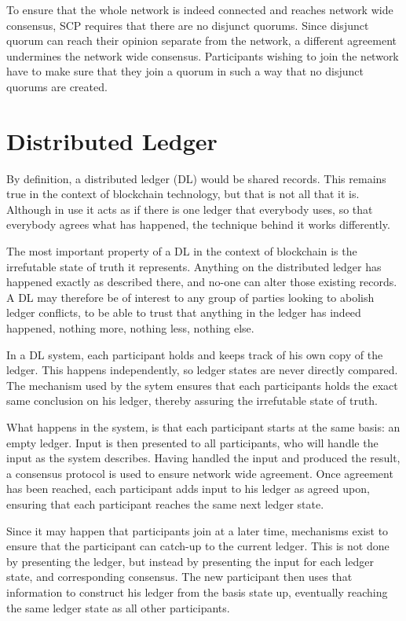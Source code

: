 \documentclass[12pt]{report}
\theoremstyle{plain}
\theoremstyle{definition}
\begin{document}
	To ensure that the whole network is indeed connected and reaches network wide consensus, SCP requires that there are no disjunct quorums. Since disjunct quorum can reach their opinion separate from the network, a different agreement undermines the network wide consensus. Participants wishing to join the network have to make sure that they join a quorum in such a way that no disjunct quorums are created.
	
	\section{Distributed Ledger}
	By definition, a distributed ledger\cite{distributedledger} (DL) would be shared records. This remains true in the context of blockchain technology, but that is not all that it is. Although in use it acts as if there is one ledger that everybody uses, so that everybody agrees what has happened, the technique behind it works differently.
	
	The most important property of a DL in the context of blockchain is the irrefutable state of truth it represents. Anything on the distributed ledger has happened exactly as described there, and no-one can alter those existing records. A DL may therefore be of interest to any group of parties looking to abolish ledger conflicts, to be able to trust that anything in the ledger has indeed happened, nothing more, nothing less, nothing else.
	
	In a DL system, each participant holds and keeps track of his own copy of the ledger. This happens independently, so ledger states are never directly compared. The mechanism used by the sytem ensures that each participants holds the exact same conclusion on his ledger, thereby assuring the irrefutable state of truth.
	
	What happens in the system, is that each participant starts at the same basis: an empty ledger. Input is then presented to all participants, who will handle the input as the system describes. Having handled the input and produced the result, a consensus protocol is used to ensure network wide agreement. Once agreement has been reached, each participant adds input to his ledger as agreed upon, ensuring that each participant reaches the same next ledger state.
	
	Since it may happen that participants join at a later time, mechanisms exist to ensure that the participant can catch-up to the current ledger. This is not done by presenting the ledger, but instead by presenting the input for each ledger state, and corresponding consensus. The new participant then uses that information to construct his ledger from the basis state up, eventually reaching the same ledger state as all other participants.
	
\end{document}
